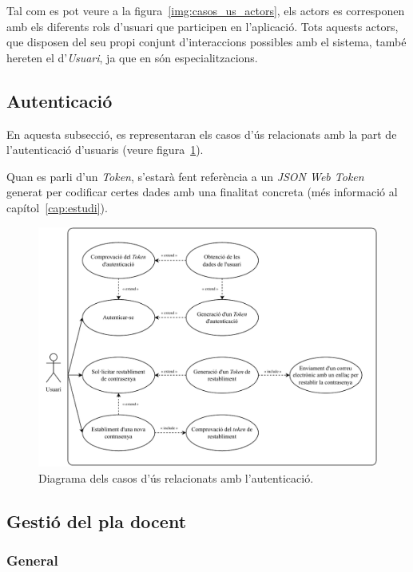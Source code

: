 \documentclass[a4paper,12pt]{ThesisStyle}
\begin{document}
Tal com es pot veure a la figura~\ref{img:casos_us_actors}, els actors es corresponen amb els diferents rols d'usuari que participen en l'aplicació. Tots aquests actors, que disposen del seu propi conjunt d'interaccions possibles amb el sistema, també hereten el d'\emph{Usuari}, ja que en són especialitzacions.

\subsection{Autenticació}
\label{subsec:casos_us_auth}

En aquesta subsecció, es representaran els casos d'ús relacionats amb la part de l'autenticació d'usuaris (veure figura~\ref{img:casos_us_auth}).

Quan es parli d'un \textit{Token}, s'estarà fent referència a un \textit{JSON Web Token}~\cite{JWT} generat per codificar certes dades amb una finalitat concreta (més informació al capítol~\ref{cap:estudi}).

\begin{figure}[H]
  \centering
  \includegraphics[width=\textwidth]{assets/use_cases/auth.pdf}
  \caption{\label{img:casos_us_auth}Diagrama dels casos d'ús relacionats amb l'autenticació.}
\end{figure}

\subsection{Gestió del pla docent}
\label{subsec:casos_us_pla}

\subsubsection{General}
\end{document}
